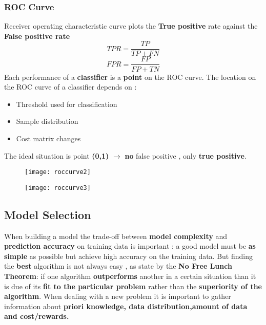 \subsubsection{ROC Curve}
Receiver operating	characteristic curve plots the \textbf{True positive} rate against the \textbf{False positive rate}
$$ TPR = \frac{TP}{TP+FN}$$
$$ FPR = \frac{FP}{FP+TN}$$
Each performance of a \textbf{classifier} is a \textbf{point} on the ROC curve. The location on the ROC curve of a classifier depends on :
\begin{itemize}
\item Threshold used for classification
\item Sample distribution
\item Cost matrix changes
\end{itemize}
The ideal situation is point \textbf{(0,1)} $\rightarrow$ \textbf{no} false positive , only \textbf{true positive}.
 \begin{figure}[H]
  \centering
  \texttt{[image: roccurve2]}
\end{figure}
\begin{figure}[H]
  \centering
  \texttt{[image: roccurve3]}
\end{figure}

\subsection{Model Selection}
When building a model the trade-off between \textbf{model complexity} and \textbf{prediction accuracy} on training data is important : a good model must be \textbf{as simple} as possible but achieve high accuracy on the training data.
But finding the \textbf{best} algorithm is not always easy , as state by the \textbf{No Free Lunch Theorem}: if one algorithm \textbf{outperforms} another in a certain situation than it is due of its \textbf{fit to the particular problem} rather than the \textbf{superiority of the algorithm}. When dealing with a new problem it is important to gather information about \textbf{priori knowledge, data distribution,amount of data and cost/rewards.}	